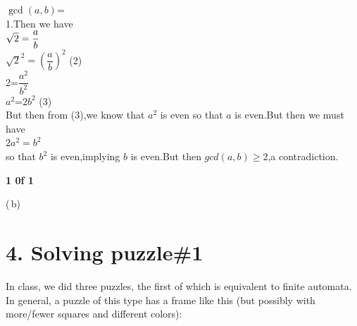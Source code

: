 \documentclass{knittingpattern}
\begin{document}
\begin{flushleft}
$ {\gcd(a,b)}$=\\
 1.Then we have \\
\hspace{6.5cm}  
\vspace{0.2cm}
 $\sqrt{2} = \Large{\dfrac{a}{b}}$\\
\vspace{0.2cm}
\hspace{6.5cm} 
$\sqrt{2}^2 = (\dfrac{a}{b})^2$ \hspace{5cm} (2)\\
\vspace{0.2cm}
\hspace{6.5cm} 
2=\large{$\dfrac{a^2}{b^2}$}\vspace{0.3cm}\\
\hspace{6.5cm}  $a^2$=$2b^2$ \hspace{6cm} (3)\\
\vspace{0.2cm}
 But then from (3),we know that $a^2$ is even so that $a$ is even.But then we must have \\ \vspace{0.2cm}  \hspace{5cm} $ 2a^2 = b^2 $\\
\vspace{0.2cm} 
 so that $b^2$ is even,implying $b$ is even.But then {$gcd(a,b)\ge 2 $},a contradiction.
  \hspace{3cm}
  \framebox[3mm][h]{} \\
\end{flushleft}

\vspace{3cm}
\hspace{13cm}\textbf{1 0f 1}
\newpage
\noindent{}
\hline
\usetikzlibrary{automata, positioning,arrows}

(\,b)\,
\section*{4. Solving puzzle\#1}In class, we did three puzzles, the first of which is equivalent to
finite automata. In general, a puzzle of this type has a frame like this (but possibly
with more/fewer squares and different colors):
\end{document}
